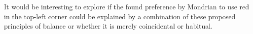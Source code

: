 It would be interesting to explore if the found preference by Mondrian to use
red in the top-left corner could be explained by a combination of these proposed
principles of balance or whether it is merely coincidental or habitual.





